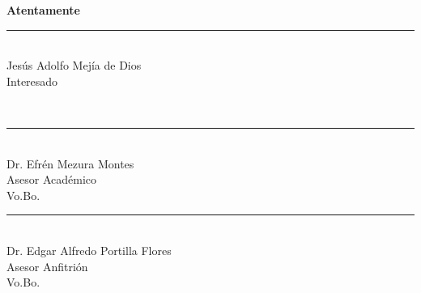 \documentclass[12pt,letterpaper, xcolor=table, x11names]{article}
\begin{document}
\vspace{1cm}
\begin{center}
	\textbf{Atentamente}
	\\[3cm]
	\begin{minipage}{.4\textwidth}
		\centering
		\rule{\textwidth}{1pt}\\
		Jesús Adolfo Mejía de Dios\\
		Interesado
	\end{minipage}
	\\[3cm]
	\begin{minipage}{.4\textwidth}
		\centering
		\rule{\textwidth}{1pt}\\
		Dr. Efrén Mezura Montes\\
		Asesor Académico\\
		Vo.Bo.
	\end{minipage}
	\hspace{1cm}
	\begin{minipage}{.4\textwidth}
		\centering
		\rule{\textwidth}{1pt}\\
		Dr. Edgar Alfredo Portilla Flores\\
		Asesor Anfitrión\\
		Vo.Bo.
	\end{minipage}

\end{center}
\end{document}
